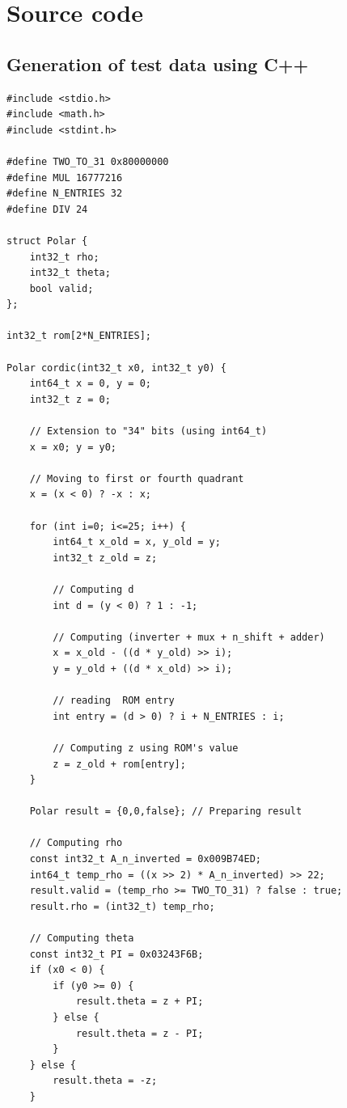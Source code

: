 \documentclass[12pt,a4paper]{report}
\begin{document}
\appendix

\chapter{Source code}

\section{Generation of test data using C++}
\label{sec:test_generator}

\begin{lstlisting}[caption={Test-data generation}]
#include <stdio.h>
#include <math.h>
#include <stdint.h>

#define TWO_TO_31 0x80000000
#define MUL 16777216
#define N_ENTRIES 32
#define DIV 24

struct Polar {
    int32_t rho;
    int32_t theta;
    bool valid;
};

int32_t rom[2*N_ENTRIES];

Polar cordic(int32_t x0, int32_t y0) {
    int64_t x = 0, y = 0;
    int32_t z = 0;
    
    // Extension to "34" bits (using int64_t)
    x = x0; y = y0;
    
    // Moving to first or fourth quadrant
    x = (x < 0) ? -x : x;
    
    for (int i=0; i<=25; i++) {
        int64_t x_old = x, y_old = y;
        int32_t z_old = z;
        
        // Computing d
        int d = (y < 0) ? 1 : -1;
        
        // Computing (inverter + mux + n_shift + adder)
        x = x_old - ((d * y_old) >> i);
        y = y_old + ((d * x_old) >> i);
        
        // reading  ROM entry
        int entry = (d > 0) ? i + N_ENTRIES : i;
        
        // Computing z using ROM's value
        z = z_old + rom[entry];
    }
    
    Polar result = {0,0,false}; // Preparing result
    
    // Computing rho
    const int32_t A_n_inverted = 0x009B74ED;
    int64_t temp_rho = ((x >> 2) * A_n_inverted) >> 22;
    result.valid = (temp_rho >= TWO_TO_31) ? false : true;
    result.rho = (int32_t) temp_rho;
    
    // Computing theta
    const int32_t PI = 0x03243F6B;
    if (x0 < 0) {
        if (y0 >= 0) {
            result.theta = z + PI;
        } else {
            result.theta = z - PI;
        }
    } else {
        result.theta = -z;
    }
    

\end{lstlisting}
\end{document}
